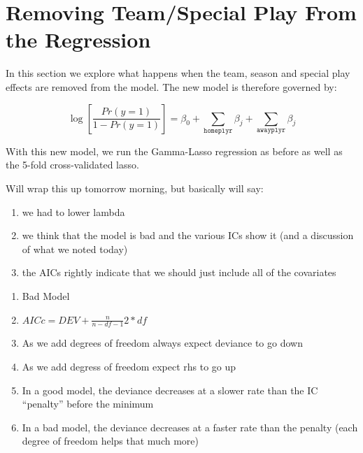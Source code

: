 \documentclass[11pt, fleqn]{article}
\begin{document}


\section{Removing Team/Special Play From the Regression}

In this section we explore what happens when the team, season and special play effects are removed from the model.  The new model is therefore governed by:

\[ \log\left[\frac{Pr(y=1)}{1-Pr(y=1)}\right] = \beta_0 + \sum_{\texttt{homeplyr}} \beta_j + \sum_{\texttt{awayplyr}} \beta_j \]

With this new model, we run the Gamma-Lasso regression as before as well as the 5-fold cross-validated lasso.

Will wrap this up tomorrow morning, but basically will say:
\begin{enumerate}
  \item we had to lower lambda
  \item we think that the model is bad and the various ICs show it (and a discussion of what we noted today)
  \item the AICs rightly indicate that we should just include all of the covariates
\end{enumerate}

\begin{enumerate}
  \item Bad Model
  \item $AICc = DEV + \frac{n}{n-df-1}2*df$
  \item As we add degrees of freedom always expect deviance to go down
  \item As we add degress of freedom expect rhs to go up
  \item In a good model, the deviance decreases at a slower rate than the IC ``penalty'' before the minimum
  \item In a bad model, the deviance decreases at a faster rate than the penalty (each degree of freedom helps that much more)
\end{enumerate}
\end{document}
